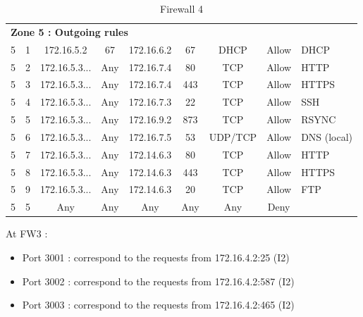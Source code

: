 \documentclass[a4paper,titlepage]{article}
\begin{document}
\begin{table}[h]
\begin{tabular}{c|c|cc|cc|ccl}
		\hline
		\multicolumn{9}{l}{\textbf{Zone 5 : Outgoing rules}}\\
		5 & 1 & 172.16.5.2 & 67 & 172.16.6.2 & 67 & DHCP & Allow & DHCP\\
		5 & 2 & 172.16.5.3... & Any & 172.16.7.4 & 80 & TCP & Allow & HTTP \\
		5 & 3 & 172.16.5.3... & Any & 172.16.7.4 & 443 & TCP & Allow & HTTPS \\
		5 & 4 & 172.16.5.3... & Any & 172.16.7.3 & 22 & TCP & Allow & SSH \\
		5 & 5 & 172.16.5.3... & Any & 172.16.9.2 & 873 & TCP & Allow & RSYNC \\
		5 & 6 & 172.16.5.3... & Any & 172.16.7.5 & 53 & UDP/TCP & Allow & DNS (local) \\
		5 & 7 & 172.16.5.3... & Any & 172.14.6.3 & 80 & TCP & Allow & HTTP \\
		5 & 8 & 172.16.5.3... & Any & 172.14.6.3 & 443 & TCP & Allow & HTTPS \\
		5 & 9 & 172.16.5.3... & Any & 172.14.6.3 & 20 & TCP & Allow & FTP \\
		5 & 5 & Any & Any & Any & Any & Any & Deny & \\


	\end{tabular}
	\caption{Firewall 4}
\end{table}



At FW3 :
\begin{itemize}
	\item Port 3001 : correspond to the requests from 172.16.4.2:25 (I2)
	\item Port 3002 : correspond to the requests from 172.16.4.2:587 (I2)
	\item Port 3003 : correspond to the requests from 172.16.4.2:465 (I2)
\end{itemize}
\end{document}
